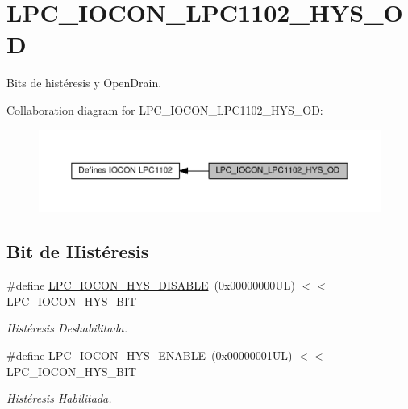 \hypertarget{group___l_p_c___i_o_c_o_n___l_p_c1102___h_y_s___o_d}{}\section{L\+P\+C\+\_\+\+I\+O\+C\+O\+N\+\_\+\+L\+P\+C1102\+\_\+\+H\+Y\+S\+\_\+\+OD}
\label{group___l_p_c___i_o_c_o_n___l_p_c1102___h_y_s___o_d}


Bits de histéresis y Open\+Drain.  


Collaboration diagram for L\+P\+C\+\_\+\+I\+O\+C\+O\+N\+\_\+\+L\+P\+C1102\+\_\+\+H\+Y\+S\+\_\+\+OD\+:\nopagebreak
\begin{figure}[H]
\begin{center}
\leavevmode
\includegraphics[width=350pt]{group___l_p_c___i_o_c_o_n___l_p_c1102___h_y_s___o_d}
\end{center}
\end{figure}
\subsection*{Bit de Histéresis}
\begin{DoxyCompactItemize}
\item 
\#define \hyperlink{group___l_p_c___i_o_c_o_n___l_p_c1102___h_y_s___o_d_ga37fea43bae0bff269cca743ebc6e9721}{L\+P\+C\+\_\+\+I\+O\+C\+O\+N\+\_\+\+H\+Y\+S\+\_\+\+D\+I\+S\+A\+B\+LE}~(0x00000000\+U\+L) $<$$<$ L\+P\+C\+\_\+\+I\+O\+C\+O\+N\+\_\+\+H\+Y\+S\+\_\+\+B\+IT
\begin{DoxyCompactList}\small\item\em Histéresis Deshabilitada. \end{DoxyCompactList}\item 
\#define \hyperlink{group___l_p_c___i_o_c_o_n___l_p_c1102___h_y_s___o_d_gafc7412adb3bb3d0a62397014fe66ed7a}{L\+P\+C\+\_\+\+I\+O\+C\+O\+N\+\_\+\+H\+Y\+S\+\_\+\+E\+N\+A\+B\+LE}~(0x00000001\+U\+L) $<$$<$ L\+P\+C\+\_\+\+I\+O\+C\+O\+N\+\_\+\+H\+Y\+S\+\_\+\+B\+IT
\begin{DoxyCompactList}\small\item\em Histéresis Habilitada. \end{DoxyCompactList}\end{DoxyCompactItemize}
